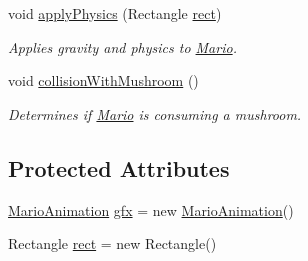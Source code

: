 \begin{DoxyCompactItemize}
void \hyperlink{classnl_1_1arjanfrans_1_1mario_1_1model_1_1Mario_a9b056f3922cbd9f3b7a1e12c71a921d6}{apply\+Physics} (Rectangle \hyperlink{classnl_1_1arjanfrans_1_1mario_1_1model_1_1Mario_a305117c37af2618742feafceffd893be}{rect})
\begin{DoxyCompactList}\small\item\em Applies gravity and physics to \hyperlink{classnl_1_1arjanfrans_1_1mario_1_1model_1_1Mario}{Mario}. \end{DoxyCompactList}\item 
void \hyperlink{classnl_1_1arjanfrans_1_1mario_1_1model_1_1Mario_a19d885fce354f45ae4419abd36cd795e}{collision\+With\+Mushroom} ()
\begin{DoxyCompactList}\small\item\em Determines if \hyperlink{classnl_1_1arjanfrans_1_1mario_1_1model_1_1Mario}{Mario} is consuming a mushroom. \end{DoxyCompactList}\end{DoxyCompactItemize}
\subsection*{Protected Attributes}
\begin{DoxyCompactItemize}
\item 
\hyperlink{classnl_1_1arjanfrans_1_1mario_1_1graphics_1_1MarioAnimation}{Mario\+Animation} \hyperlink{classnl_1_1arjanfrans_1_1mario_1_1model_1_1Mario_a62bcb1022af69fedb1191fba75da65b2}{gfx} = new \hyperlink{classnl_1_1arjanfrans_1_1mario_1_1graphics_1_1MarioAnimation}{Mario\+Animation}()
\item 
Rectangle \hyperlink{classnl_1_1arjanfrans_1_1mario_1_1model_1_1Mario_a305117c37af2618742feafceffd893be}{rect} = new Rectangle()
\end{DoxyCompactItemize}
